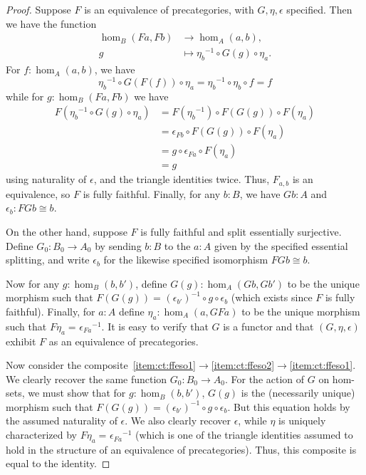 \documentclass[10pt,a4paper]{article}
\newcommand{\id}[3][]{\ensuremath{#2 =_{#1} #3}\xspace}
\newcommand{\inv}[1]{{#1}^{-1}}
\theoremstyle{definition}
\theoremstyle{remark}
\numberwithin{equation}{section}
\begin{document}
\begin{proof}
  Suppose $F$ is an equivalence of precategories, with $G,\eta,\epsilon$ specified.
  Then we have the function
  \begin{align*}
      \hom_B(Fa,Fb) &\to \hom_A(a,b),\\
      g &\mapsto \inv{\eta_b}\circ G(g)\circ \eta_a.
  \end{align*}
  For $f:\hom_A(a,b)$, we have
  \[ \inv{\eta_{b}}\circ G(F(f))\circ \eta_{a}  =
  \inv{\eta_{b}} \circ \eta_{b} \circ f=
  f
  \]
  while for $g:\hom_B(Fa,Fb)$ we have
  \begin{align*}
    F(\inv{\eta_b} \circ G(g)\circ\eta_a)
    &= F(\inv{\eta_b})\circ F(G(g))\circ F(\eta_a)\\
    &= \epsilon_{Fb}\circ F(G(g))\circ F(\eta_a)\\
    &= g\circ\epsilon_{Fa}\circ F(\eta_a)\\
    &= g
  \end{align*}
  using naturality of $\epsilon$, and the triangle identities twice.
  Thus, $F_{a,b}$ is an equivalence, so $F$ is fully faithful.
  Finally, for any $b:B$, we have $Gb:A$ and $\epsilon_b:FGb\cong b$.

  On the other hand, suppose $F$ is fully faithful and split essentially surjective.
  Define $G_0:B_0\to A_0$ by sending $b:B$ to the $a:A$ given by the specified essential splitting, and write $\epsilon_b$ for the likewise specified isomorphism $FGb\cong b$.

  Now for any $g:\hom_B(b,b')$, define $G(g):\hom_A(Gb,Gb')$ to be the unique morphism such that $\id{F(G(g))}{\inv{(\epsilon_{b'})}\circ g \circ \epsilon_b }$ (which exists since $F$ is fully faithful).
  Finally, for $a:A$ define $\eta_a:\hom_A(a,GFa)$ to be the unique morphism such that $\id{F\eta_a}{\inv{\epsilon_{Fa}}}$.
  It is easy to verify that $G$ is a functor and that $(G,\eta,\epsilon)$ exhibit $F$ as an equivalence of precategories.

  Now consider the composite~\ref{item:ct:ffeso1}$\to$\ref{item:ct:ffeso2}$\to$\ref{item:ct:ffeso1}.
  We clearly recover the same function $G_0:B_0 \to A_0$.
  For the action of $G$ on hom-sets, we must show that for $g:\hom_B(b,b')$, $G(g)$ is the (necessarily unique) morphism such that $F(G(g)) = \inv{(\epsilon_{b'})}\circ g \circ \epsilon_b$.
  But this equation holds by the assumed naturality of $\epsilon$.
  We also clearly recover $\epsilon$, while $\eta$ is uniquely characterized by $\id{F\eta_a}{\inv{\epsilon_{Fa}}}$ (which is one of the triangle identities assumed to hold in the structure of an equivalence of precategories).
  Thus, this composite is equal to the identity.


\end{proof}
\end{document}
